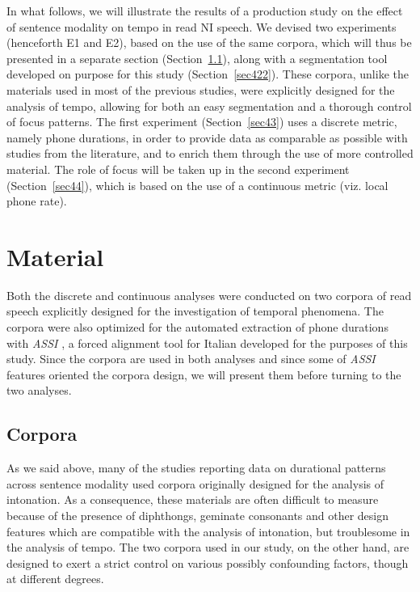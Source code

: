 In what follows, we will illustrate the results of a production study on the effect of sentence modality on tempo in read NI speech. We devised two experiments (henceforth E1 and E2), based on the use of the same corpora, which will thus be presented in a separate section (Section~\ref{sec421}), along with a segmentation tool developed on purpose for this study (Section~\ref{sec422}). These corpora, unlike the materials used in most of the previous studies, were explicitly designed for the analysis of tempo, allowing for both an easy segmentation and a thorough control of focus patterns. The first experiment (Section~\ref{sec43}) uses a discrete metric, namely phone durations, in order to provide data as comparable as possible with studies from the literature, and to enrich them through the use of more controlled material. The role of focus will be taken up in the second experiment (Section~\ref{sec44}), which is based on the use of a continuous metric (viz. local phone rate).

\section{Material}\label{sec42}
Both the discrete and continuous analyses were conducted on two corpora of read speech explicitly designed for the investigation of temporal phenomena. The corpora were also optimized for the automated extraction of phone durations with \textit{ASSI} \citep{cangemi2011automatic}, a forced alignment tool for Italian developed for the purposes of this study. Since the corpora are used in both analyses and since some of \textit{ASSI} features oriented the corpora design, we will present them before turning to the two analyses.

\subsection{Corpora}\label{sec421}
As we said above, many of the studies reporting data on durational patterns across sentence modality used corpora originally designed for the analysis of intonation. As a consequence, these materials are often difficult to measure because of the presence of diphthongs, geminate consonants and other design features which are compatible with the analysis of intonation, but troublesome in the analysis of tempo. The two corpora used in our study, on the other hand, are designed to exert a strict control on various possibly confounding factors, though at different degrees.

